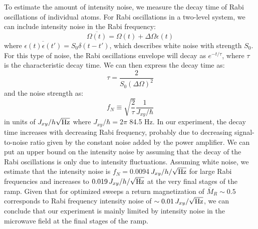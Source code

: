 \documentclass[12pt]{iopart}
\begin{document}
To estimate the amount of intensity noise, we measure the decay time of Rabi oscillations of individual atoms. For Rabi oscillations in a two-level system, we can include intensity noise in the Rabi frequency:
\begin{equation}
    \overline{\Omega(t)} = \Omega(t) + \Delta \Omega \epsilon(t) 
\end{equation}
where $\overline{\epsilon(t) \epsilon(t')} = S_0 \delta(t-t')$, which describes white noise with strength  $S_0$. For this type of noise, the Rabi oscillations envelope will decay as $e^{-t/\tau}$, where $\tau$ is the characteristic decay time. We can then express the decay time as:
\begin{equation}
    \tau = \frac{2}{S_0(\Delta \Omega)^2}
\end{equation}
and the noise strength as:
\begin{equation}
   f_N \equiv \sqrt{\frac{2}{\tau}} \frac{1}{J_{xy}/\hbar }
\end{equation}
in units of $J_{xy}/h\sqrt{\rm Hz}$ where $J_{xy}/\hbar = 2\pi$ 84.5 Hz. In our experiment, the decay time increases with decreasing Rabi frequency, probably due to decreasing signal-to-noise ratio given by the constant noise added by the power amplifier.  We can put an upper bound on the intensity noise by assuming that the decay of the Rabi oscillations is only due to intensity fluctuations. Assuming white noise, we estimate that the intensity noise is $f_N= $0.0094$\, J_{xy}/h/\sqrt{\rm Hz}$ for large Rabi frequencies and increases to $0.019\, J_{xy}/h/\sqrt{\rm Hz}$ at the very final stages of the ramp. Given that for optimized sweeps a return magnetization of $\overline{M}_R \sim 0.5$ corresponds to Rabi frequency intensity noise of $\sim 0.01\, J_{xy}/\sqrt{\rm Hz}$, we can conclude that our experiment is mainly limited by intensity noise in the microwave field at the final stages of the ramp. 
\end{document}
